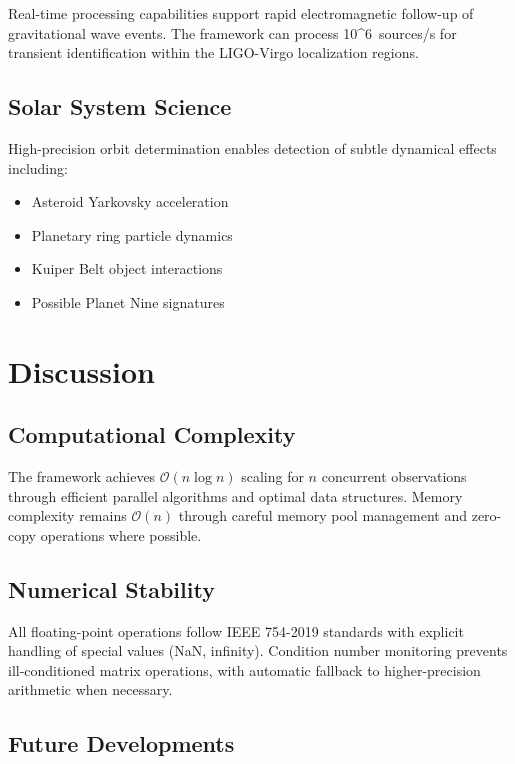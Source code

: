 \documentclass[twocolumn]{article}
\begin{document}
Real-time processing capabilities support rapid electromagnetic follow-up of gravitational wave events. The framework can process \SI{10^6}{sources/s} for transient identification within the LIGO-Virgo localization regions.

\subsection{Solar System Science}

High-precision orbit determination enables detection of subtle dynamical effects including:
\begin{itemize}
\item Asteroid Yarkovsky acceleration
\item Planetary ring particle dynamics  
\item Kuiper Belt object interactions
\item Possible Planet Nine signatures
\end{itemize}

\section{Discussion}

\subsection{Computational Complexity}

The framework achieves $\mathcal{O}(n \log n)$ scaling for $n$ concurrent observations through efficient parallel algorithms and optimal data structures. Memory complexity remains $\mathcal{O}(n)$ through careful memory pool management and zero-copy operations where possible.

\subsection{Numerical Stability}

All floating-point operations follow IEEE 754-2019 standards with explicit handling of special values (NaN, infinity). Condition number monitoring prevents ill-conditioned matrix operations, with automatic fallback to higher-precision arithmetic when necessary.

\subsection{Future Developments}
\end{document}
